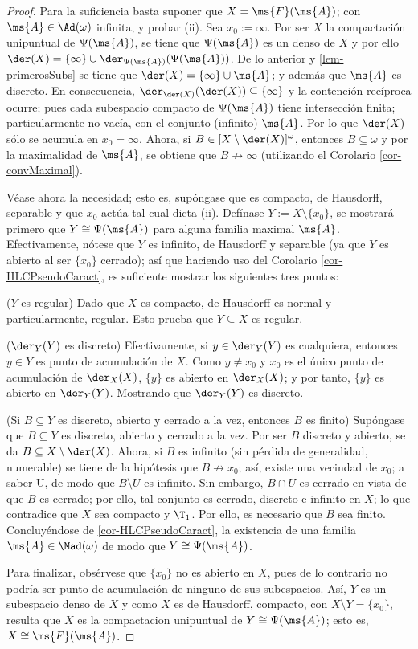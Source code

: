 	\begin{proof} 
		Para la suficiencia basta suponer que $X=\ms{F}(\ms{A})$; con $\ms{A} \in \Ad(\omega)$ infinita, y probar (ii). Sea $x_0:=\infty$. Por ser $X$ la compactación unipuntual de $\Psi(\ms{A})$, se tiene que $\Psi(\ms{A})$ es un denso de $X$ y por ello $\der(X) = \{\infty\} \cup \der_{\Psi(\ms{A})}(\Psi(\ms{A}))$. De lo anterior y \ref{lem-primerosSubs} se tiene que $\der(X) = \{\infty\} \cup \ms{A}$; y además que $\ms{A}$ es discreto. En consecuencia, $\der_{\der(X)}(\der(X)) \subseteq \{\infty\}$ y la contención recíproca ocurre; pues cada subespacio compacto de $\Psi(\ms{A})$ tiene intersección finita; particularmente no vacía, con el conjunto (infinito) $\ms{A}$. Por lo que $\der(X)$ sólo se acumula en $x_0=\infty$. Ahora, si $B \in [X \setminus \der(X)]^\omega$, entonces $B \subseteq \omega$ y por la maximalidad de $\ms{A}$, se obtiene que $B \not\to \infty$ (utilizando el Corolario \ref{cor-convMaximal}).

		Véase ahora la necesidad; esto es, supóngase que es compacto, de Hausdorff, separable y que $x_0$ actúa tal cual dicta (ii). Defínase $Y:=X\setminus \{x_0\}$, se mostrará primero que $Y \cong \Psi(\ms{A})$ para alguna familia maximal $\ms{A}$. Efectivamente, nótese que $Y$ es infinito, de Hausdorff y separable (ya que $Y$ es abierto al ser $\{x_0\}$ cerrado); así que haciendo uso del Corolario \ref{cor-HLCPseudoCaract}, es suficiente mostrar los siguientes tres puntos:

		($Y$ es regular) Dado que $X$ es compacto, de Hausdorff es normal y particularmente, regular. Esto prueba que $Y \subseteq X$ es regular.

		($\der_Y(Y)$ es discreto) Efectivamente, si $y \in \der_Y(Y)$ es cualquiera, entonces $y \in Y$ es punto de acumulación de $X$. Como $y \neq x_0$ y $x_0$ es el único punto de acumulación de $\der_X(X)$, $\{y\}$ es abierto en $\der_X(X)$; y por tanto, $\{y\}$ es abierto en $\der_Y(Y)$. Mostrando que $\der_Y(Y)$ es discreto.

		(Si $B \subseteq Y$ es discreto, abierto y cerrado a la vez, entonces $B$ es finito) Supóngase que $B \subseteq Y$ es discreto, abierto y cerrado a la vez. Por ser $B$ discreto y abierto, se da $B \subseteq X \setminus \der(X)$. Ahora, si $B$ es infinito (sin pérdida de generalidad, numerable) se tiene de la hipótesis que $B \not\to x_0$; así, existe una vecindad de $x_0$; a saber U, de modo que $B \setminus U$ es infinito. Sin embargo, $B \cap U$ es cerrado en vista de que $B$ es cerrado; por ello, tal conjunto es cerrado, discreto e infinito en $X$; lo que contradice que $X$ sea compacto y $\T_1$. Por ello, es necesario que $B$ sea finito. Concluyéndose de \ref{cor-HLCPseudoCaract}, la existencia de una familia $\ms{A}\in\Mad(\omega)$ de modo que $Y \cong \Psi(\ms{A})$.

		Para finalizar, obsérvese que $\{x_0\}$ no es abierto en $X$, pues de lo contrario no podría ser punto de acumulación de ninguno de sus subespacios. Así, $Y$ es un subespacio denso de $X$ y como $X$ es de Hausdorff, compacto, con $X \setminus Y = \{x_0\}$, resulta que $X$ es la compactacion unipuntual de $Y \cong \Psi(\ms{A})$; esto es, $X \cong \ms{F}(\ms{A})$.
	\end{proof}

